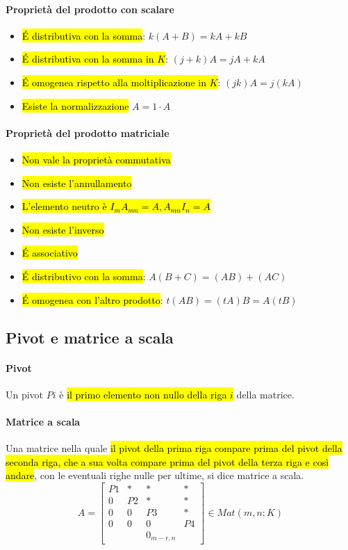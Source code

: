 \paragraph{Proprietà del prodotto con scalare}
\begin{itemize}
    \item \hl{\'E distributiva con la somma}: $k (A + B) = kA + kB$
    \item \hl{\'E distributiva con la somma in $K$}: $(j + k)A = jA + kA$
    \item \hl{\'E omogenea rispetto alla moltiplicazione in $K$}:
        $(jk)A = j(kA)$
    \item \hl{Esiste la normalizzazione} $A = 1 \cdot A$
\end{itemize}

\paragraph{Proprietà del prodotto matriciale}
\begin{itemize}
    \item \hl{Non vale la proprietà commutativa}
    \item \hl{Non esiste l'annullamento}
    \item \hl{L'elemento neutro è $I_{m}A_{mn} = A, A_{mn}I_{n} = A$}
    \item \hl{Non esiste l'inverso}
    \item \hl{\'E associativo}
    \item \hl{\'E distributivo con la somma}: $A(B+C) = (AB) + (AC)$
    \item \hl{\'E omogenea con l'altro prodotto}: $t(AB) = (tA)B = A(tB)$
\end{itemize}

\subsection{Pivot e matrice a scala}
\paragraph{Pivot} Un pivot $Pi$ è \hl{il primo elemento non nullo della riga $i$}
della matrice.

\paragraph{Matrice a scala} Una matrice nella quale \hl{il pivot della prima riga
compare prima del pivot della seconda riga, che a sua volta compare prima del
pivot della terza riga e così andare}, con le eventuali righe nulle per ultime, si
dice matrice a scala.
\[
    A =
    \begin{bmatrix}
        P1 & *  & *  & * \\
        0  & P2 & *  & * \\
        0  & 0  & P3 & * \\
        0  & 0  & 0  & P4 \\
        & & 0_{m-r, n} &
    \end{bmatrix} \in Mat(m,n;K)
\]

